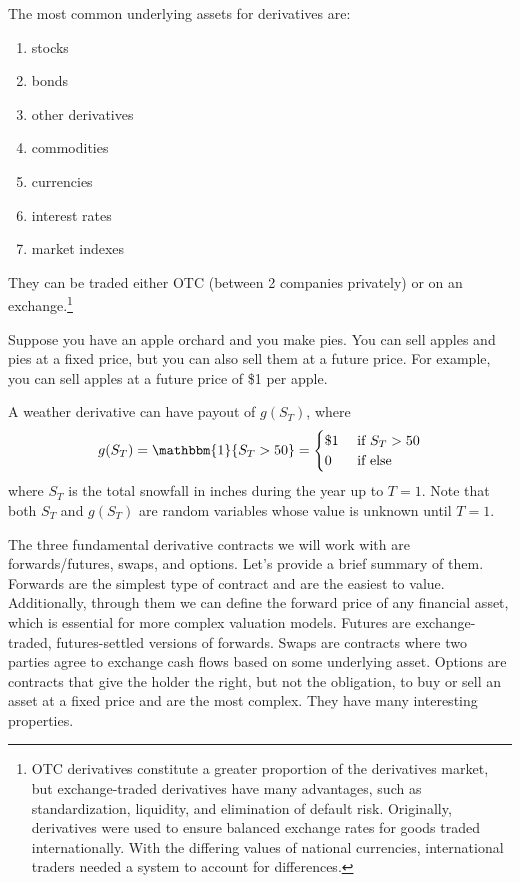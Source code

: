 \documentclass{article}
\begin{document}
    The most common underlying assets for derivatives are: 
    \begin{enumerate}
      \item stocks
      \item bonds
      \item other derivatives 
      \item commodities
      \item currencies
      \item interest rates 
      \item market indexes 
    \end{enumerate}
    They can be traded either OTC (between 2 companies privately) or on an exchange.\footnote{OTC derivatives constitute a greater proportion of the derivatives market, but exchange-traded derivatives have many advantages, such as standardization, liquidity, and elimination of default risk. Originally, derivatives were used to ensure balanced exchange rates for goods traded internationally. With the differing values of national currencies, international traders needed a system to account for differences. }

    \begin{example} 
      Suppose you have an apple orchard and you make pies. You can sell apples and pies at a fixed price, but you can also sell them at a future price. For example, you can sell apples at a future price of \$1 per apple. 
    \end{example}

    \begin{example}
      A weather derivative can have payout of $g(S_T)$, where 
      \begin{equation}
        g(S_T) = \mathbbm{1} \{S_T > 50\} = \begin{cases} \$1 & \text{ if } S_T > 50 \\ 0 & \text{ if else} \end{cases}
      \end{equation}
      where $S_T$ is the total snowfall in inches during the year up to $T = 1$. Note that both $S_T$ and $g(S_T)$ are random variables whose value is unknown until $T = 1$.
    \end{example}

    The three fundamental derivative contracts we will work with are forwards/futures, swaps, and options. Let's provide a brief summary of them. Forwards are the simplest type of contract and are the easiest to value. Additionally, through them we can define the forward price of any financial asset, which is essential for more complex valuation models. Futures are exchange-traded, futures-settled versions of forwards. Swaps are contracts where two parties agree to exchange cash flows based on some underlying asset. Options are contracts that give the holder the right, but not the obligation, to buy or sell an asset at a fixed price and are the most complex. They have many interesting properties. 
\end{document}
